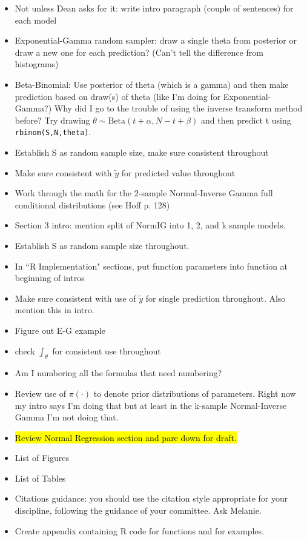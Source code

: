 \documentclass[12pt, a4paper]{article}
\begin{document}
\begin{itemize}
  \item Not unless Dean asks for it:  write intro paragraph (couple of sentences) for each model
  \item Exponential-Gamma random sampler:  draw a single theta from posterior or draw a new one for each prediction?  (Can't tell the difference from histograms)
  \item Beta-Binomial:  Use posterior of theta (which is a gamma) and then make prediction based on draw(s) of theta (like I'm doing for Exponential-Gamma?)  Why did I go to the trouble of using the inverse transform method before?  Try drawing $\theta\sim\text{Beta}(t+\alpha,N-t+\beta)$ and then predict t using \texttt{rbinom(S,N,theta)}.
  \item Establish S as random sample size, make sure consistent throughout
  \item Make sure consistent with $\tilde{y}$ for predicted value throughout
  \item Work through the math for the 2-sample Normal-Inverse Gamma full conditional distributions (see Hoff p. 128)
  \item Section 3 intro:  mention split of NormIG into 1, 2, and k sample models.
  \item Establish S as random sample size throughout.
  \item In ``R Implementation" sections, put function parameters into function at beginning of intros
  \item Make sure consistent with use of $\tilde{y}$ for single prediction throughout.  Also mention this in intro.
  \item Figure out E-G example
  \item check $\int_\theta$ for consistent use throughout
  \item Am I numbering all the formulas that need numbering?
  \item Review use of $\pi(\cdot)$ to denote prior distributions of parameters.  Right now my intro says I'm doing that but at least in the k-sample Normal-Inverse Gamma I'm not doing that.
  \item \hl{Review Normal Regression section and pare down for draft.}
  \item List of Figures
  \item List of Tables
  \item Citations guidance:  you should use the citation style appropriate for your discipline, following
the guidance of your committee.  Ask Melanie.
  \item Create appendix containing R code for functions and for examples.
\end{itemize}
\end{document}
